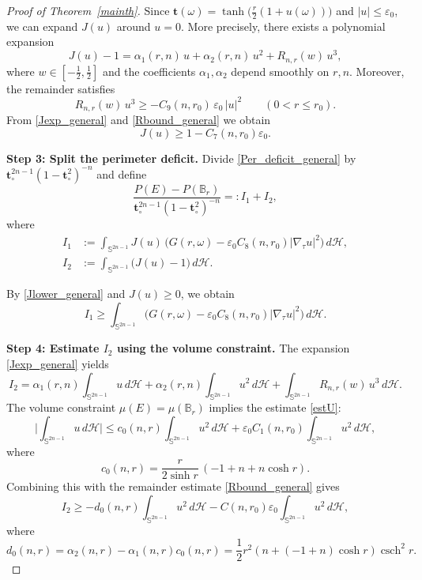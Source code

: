 \documentclass[11pt]{amsart}
\newcommand{\csch}{\operatorname{csch}}
\numberwithin{equation}{section}
\def\ge{\geqslant}
\begin{document}
\begin{proof}[Proof of Theorem~\ref{mainth}]
Since $\mathbf t(\omega)=\tanh\!\big(\frac r2(1+u(\omega))\big)$ and $|u|\le \varepsilon_0$,
we can expand $J(u)$ around $u=0$. More precisely, there exists a polynomial expansion
\begin{equation}\label{Jexp_general}
J(u)-1 = \alpha_1(r,n)\,u + \alpha_2(r,n)\,u^2 + R_{n,r}(w)\,u^3,
\end{equation}
where $w\in[-\frac12,\frac12]$ and the coefficients $\alpha_1,\alpha_2$ depend smoothly on $r,n$.
Moreover, the remainder satisfies
\begin{equation}\label{Rbound_general}
R_{n,r}(w)\,u^3 \ge -C_9(n,r_0)\,\varepsilon_0\,|u|^2
\qquad (0<r\le r_0).
\end{equation}
From \eqref{Jexp_general} and \eqref{Rbound_general} we obtain
\begin{equation}\label{Jlower_general}
J(u)\ge 1-C_7(n,r_0)\varepsilon_0.
\end{equation}

\medskip

\noindent\textbf{Step 3: Split the perimeter deficit.}
Divide \eqref{Per_deficit_general} by $\mathbf t_\circ^{2n-1}(1-\mathbf t_\circ^2)^{-n}$
and define
\[
\frac{P(E)-P(\mathbb B_r)}{\mathbf t_\circ^{2n-1}(1-\mathbf t_\circ^2)^{-n}}=:I_1+I_2,
\]
where
\begin{align*}
I_1
&:=\int_{\mathbb S^{2n-1}}J(u)\,
\Big(G(r,\omega)-\varepsilon_0 C_8(n,r_0)|\nabla_\tau u|^2\Big)\,d\mathcal H,
\\
I_2
&:=\int_{\mathbb S^{2n-1}}\big(J(u)-1\big)\,d\mathcal H.
\end{align*}

By \eqref{Jlower_general} and $J(u)\ge 0$, we obtain
\begin{equation}\label{I1lower_general}
I_1 \ge \int_{\mathbb S^{2n-1}}
\Big(G(r,\omega)-\varepsilon_0 C_8(n,r_0)|\nabla_\tau u|^2\Big)\,d\mathcal H.
\end{equation}

\medskip

\noindent\textbf{Step 4: Estimate $I_2$ using the volume constraint.}
The expansion \eqref{Jexp_general} yields
\[
I_2 = \alpha_1(r,n)\int_{\mathbb S^{2n-1}}u\,d\mathcal H
+\alpha_2(r,n)\int_{\mathbb S^{2n-1}}u^2\,d\mathcal H
+\int_{\mathbb S^{2n-1}}R_{n,r}(w)\,u^3\,d\mathcal H.
\]
The volume constraint $\mu(E)=\mu(\mathbb B_r)$ implies the estimate \eqref{estU}:
\[
\Big|\int_{\mathbb S^{2n-1}}u\,d\mathcal H\Big|
\le c_0(n,r)\int_{\mathbb S^{2n-1}}u^2\,d\mathcal H
+\varepsilon_0C_1(n,r_0)\int_{\mathbb S^{2n-1}}u^2\,d\mathcal H,
\]
where
\[
c_0(n,r)=\frac{r}{2\sinh r}\,(-1+n+n\cosh r).
\]
Combining this with the remainder estimate \eqref{Rbound_general} gives
\begin{equation}\label{I2lower_general}
I_2 \ge -d_0(n,r)\int_{\mathbb S^{2n-1}}u^2\,d\mathcal H
-C(n,r_0)\varepsilon_0\int_{\mathbb S^{2n-1}}u^2\,d\mathcal H,
\end{equation}
where $$d_0(n,r) = \alpha_2(n,r) - \alpha_1(n,r) c_0(n,r) = \frac{1}{2}r^{2}\left(n+(-1+n)\cosh r\right)\csch^{2}r.
$$
\medskip


\end{proof}
\end{document}
